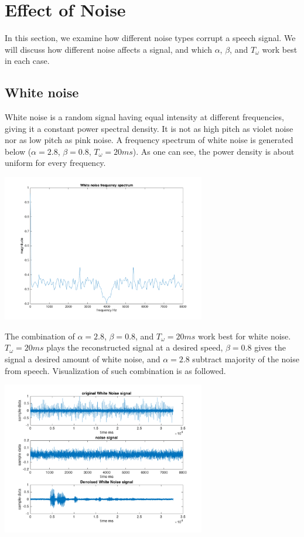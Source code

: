 \documentclass[journal]{IEEEtran}
\begin{document}
\section{Effect of Noise}
\begin{flushleft}
In this section, we examine how different noise types corrupt a speech signal. We will discuss how different noise affects a signal, and which $\alpha$, $\beta$, and $T_\omega$ work best in each case. 
\end{flushleft}

\subsection{White noise}
\begin{flushleft}
White noise is a random signal having equal intensity at different frequencies, giving it a constant power spectral density. It is not as high pitch as violet noise nor as low pitch as pink noise. A frequency spectrum of white noise is generated below ($\alpha = 2.8$, $\beta = 0.8$, $T_\omega = 20ms$). As one can see, the power density is about uniform for every frequency.
\end{flushleft}
\centering 
\includegraphics[width=3.5in]{whitenoise_log}
\begin{flushleft}
The combination of $\alpha = 2.8$, $\beta = 0.8$, and $T_\omega = 20ms$ work best for white noise. $T_\omega = 20ms$ plays the reconstructed signal at a desired speed, $\beta = 0.8$ gives the signal a desired amount of white noise, and $\alpha = 2.8$ subtract majority of the noise from speech. Visualization of such combination is as followed. 
\end{flushleft}
\centering 
\includegraphics[width=3.5in]{WhiteNoise}
\end{document}
